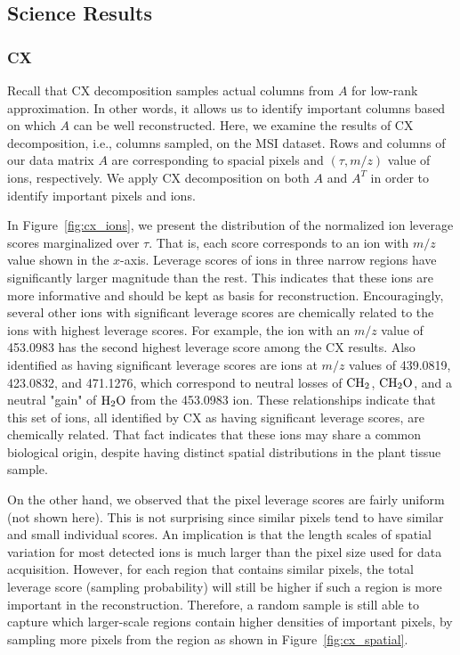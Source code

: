   \subsection{Science Results}
  \subsubsection{CX}
  Recall that CX decomposition samples actual columns from $A$ for low-rank approximation. In other words, it allows us to identify important columns based on which $A$ can be well reconstructed. Here, we examine the results of CX decomposition, i.e., columns sampled, on the MSI dataset.
 Rows and columns of our data matrix $A$ are corresponding to spacial pixels and $(\tau, m/z)$ value of ions, respectively. We apply CX decomposition on both $A$ and $A^T$ in order to identify important pixels and ions.
   
  In Figure~\ref{fig:cx_ions}, we present the distribution of the normalized ion leverage scores marginalized over $\tau$. That is, each score corresponds to an ion with $m/z$ value shown in the $x$-axis. Leverage scores of ions in three narrow regions have significantly larger magnitude than the rest. This indicates that these ions are more informative and should be kept as basis for reconstruction.  Encouragingly, several other ions with significant leverage scores are chemically related to the ions with highest leverage scores.  For example, the ion with an $m/z$ value of 453.0983 has the second highest leverage score among the CX results.  Also identified as having significant leverage scores are ions at $m/z$ values of 439.0819, 423.0832, and 471.1276, which correspond to neutral losses of $\rm{CH_2}$, $\rm{CH_2O}$, and a neutral "gain" of $\rm{H_2O}$ from the 453.0983 ion.  These relationships indicate that this set of ions, all identified by CX as having significant leverage scores, are chemically related.  That fact indicates that these ions may share a common biological origin, despite having distinct spatial distributions in the plant tissue sample.
  
  On the other hand, we observed that the pixel leverage scores are fairly uniform (not shown here). This is not surprising since similar pixels tend to have similar and small individual scores.  An implication is that the length scales of spatial variation for most detected ions is much larger than the pixel size used for data acquisition.   However, for each region that contains similar pixels, the total leverage score (sampling probability) will still be higher if such a region is more important in the reconstruction. Therefore, a random sample is still able to capture which larger-scale regions contain higher densities of important pixels, by sampling more pixels from the region as shown in Figure~\ref{fig:cx_spatial}.
  
